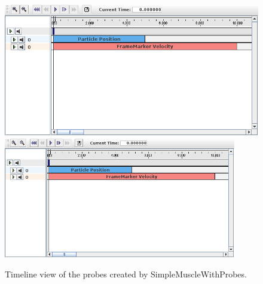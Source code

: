 
\begin{figure}[ht]
\begin{center}
\iflatexml
 \includegraphics[]{images/timelineProbes}
\else
 \includegraphics[width=4in]{images/timelineProbes}
\fi
\end{center}
\caption{Timeline view of the probes created by SimpleMuscleWithProbes.}
\label{probes:fig}
\end{figure}

